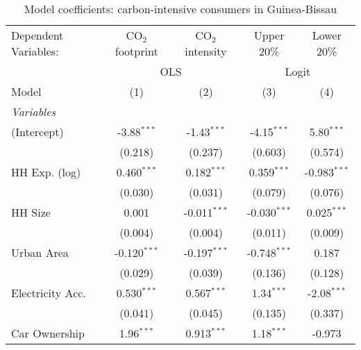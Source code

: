
\begin{table}[htbp!]
   \centering
   \small
   \begin{adjustbox}{width = 1\textwidth, max height = 0.95\textheight, center}
      \begin{threeparttable}[b]
         \caption{\label{tab:Logit_1_GNB} Model coefficients: carbon-intensive consumers in Guinea-Bissau}
         \begin{tabular}{lcccc}
            \tabularnewline \midrule \midrule
            Dependent Variables: & CO$_{2}$ footprint & CO$_{2}$ intensity & Upper 20\%     & Lower 20\%\\   
             & \multicolumn{2}{c}{OLS} & \multicolumn{2}{c}{Logit} \\ 
            Model                & (1)                & (2)                & (3)            & (4)\\  
            \midrule
            \emph{Variables}\\
            (Intercept)          & -3.88$^{***}$      & -1.43$^{***}$      & -4.15$^{***}$  & 5.80$^{***}$\\   
                                 & (0.218)            & (0.237)            & (0.603)        & (0.574)\\   
            HH Exp. (log)        & 0.460$^{***}$      & 0.182$^{***}$      & 0.359$^{***}$  & -0.983$^{***}$\\   
                                 & (0.030)            & (0.031)            & (0.079)        & (0.076)\\   
            HH Size              & 0.001              & -0.011$^{***}$     & -0.030$^{***}$ & 0.025$^{***}$\\   
                                 & (0.004)            & (0.004)            & (0.011)        & (0.009)\\   
            Urban Area           & -0.120$^{***}$     & -0.197$^{***}$     & -0.748$^{***}$ & 0.187\\   
                                 & (0.029)            & (0.039)            & (0.136)        & (0.128)\\   
            Electricity Acc.     & 0.530$^{***}$      & 0.567$^{***}$      & 1.34$^{***}$   & -2.08$^{***}$\\   
                                 & (0.041)            & (0.045)            & (0.135)        & (0.337)\\   
            Car Ownership        & 1.96$^{***}$       & 0.913$^{***}$      & 1.18$^{***}$   & -0.973\\   

\end{tabular}
\end{threeparttable}
\end{adjustbox}
\end{table}
